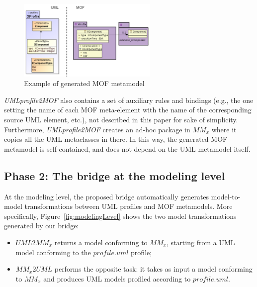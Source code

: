\begin{figure}[htbp]
	\centering
		\includegraphics[width=0.60\textwidth]{figures/metamodelingExample.png}
	\caption{Example of generated MOF metamodel}
	\label{fig:metamodelingExample}
\end{figure}


\textit{UMLprofile2MOF} also contains a set of auxiliary rules and bindings (e.g., the one setting the name of each MOF meta-element with the name of the corresponding source UML element, etc.), not described in this paper for sake of simplicity. Furthermore, \textit{UMLprofile2MOF} creates an ad-hoc package in $MM_x$ where it copies all the UML metaclasses in there. In this way, the generated MOF metamodel is self-contained, and does not depend on the UML metamodel itself.



\subsection{Phase 2: The bridge at the modeling level}\label{sec:modeLevel}

At the modeling level, the proposed bridge automatically generates model-to-model transformations between UML profiles and MOF metamodels.
More specifically, Figure~\ref{fig:modelingLevel} shows the two model transformations generated by our bridge:

\begin{itemize}
	\item $UML2MM_x$ returns a model conforming to $MM_x$, starting from a UML model conforming to the $profile.uml$ profile;
	\item $MM_x2UML$ performs the opposite task: it takes as input a model conforming to $MM_x$
	and produces UML models profiled according to $profile.uml$.
\end{itemize}

